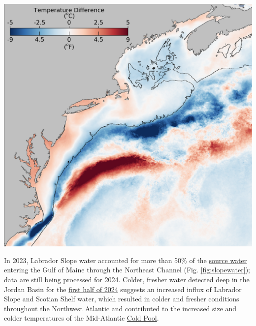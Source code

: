 \documentclass[
  10pt,
]{article}
\let\origfigure\figure
\let\endorigfigure\endfigure
\renewenvironment{figure}[1][2] {
    \expandafter\origfigure\expandafter[H]
} {
    \endorigfigure
}
\begin{document}
\begin{figure}

{\centering \includegraphics[width=0.65\linewidth]{images/BothReports/Feb2024-SST-ANOM_KHyde_2025} 

}

\caption{February 2024 sea surface temperature difference compared to the February 2000-2020 long-term mean from the NOAA Advanced Clear-Sky Processor for Ocean (ACSPO) Super-collated SST.}\label{fig:slopesea}
\end{figure}

In 2023, Labrador Slope water accounted for more than 50\% of the \href{https://noaa-edab.github.io/catalog/slopewater.html}{source water} entering the Gulf of Maine through the Northeast Channel (Fig. \ref{fig:slopewater}); data are still being processed for 2024. Colder, fresher water detected deep in the Jordan Basin for the \href{https://noaa-edab.github.io/catalog/observation_synthesis_2024.html}{first half of 2024} suggests an increased influx of Labrador Slope and Scotian Shelf water, which resulted in colder and fresher conditions throughout the Northwest Atlantic and contributed to the increased size and colder temperatures of the Mid-Atlantic \href{https://noaa-edab.github.io/catalog/cold_pool.html}{Cold Pool}.
\end{document}
